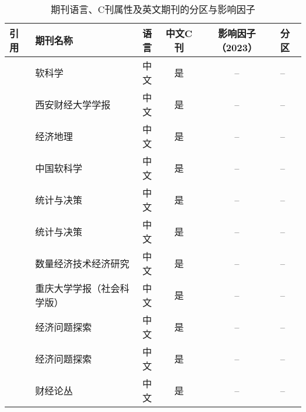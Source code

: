 \documentclass[nonblindrev]{write_paper}
\begin{document}
\newpage
 

\begin{table}[htbp]
\footnotesize
\centering
\caption{期刊语言、C刊属性及英文期刊的分区与影响因子}
\begin{tabular}{p{1cm}p{7cm}cccl}
\hline
\textbf{引用} & \textbf{期刊名称} & \textbf{语言} & \textbf{中文C刊} & \textbf{影响因子（2023）} & \textbf{分区} \\
\hline
\cite{彭桥2024中国新质生产力发展水平测度、动态演化与驱动因素研究} & 软科学 & 中文 & 是 & -- & -- \\
\cite{王珏2024新质生产力：指标构建与时空演进} & 西安财经大学学报 & 中文 & 是 & -- & -- \\
\cite{李光勤2024中国省域新质生产力水平评价、空间格局及其演化特征} & 经济地理 & 中文 & 是 & -- & -- \\

\cite{董庆前2024中国新质生产力发展水平测度、时空演变及收敛性研究} & 中国软科学 & 中文 & 是 & -- & -- \\
\cite{张海2024新质生产力发展水平、空间差异及动态演进} & 统计与决策 & 中文 & 是 & -- & -- \\
\cite{胡佳霖2024中国新质生产力：区域差距、动态演进与跃迁趋势} & 统计与决策 & 中文 & 是 & -- & -- \\
\cite{韩文龙2024新质生产力水平测算与中国经济增长新动能} & 数量经济技术经济研究 & 中文 & 是 & -- & -- \\
\cite{卢江2024新质生产力发展水平、区域差异与提升路径} & 重庆大学学报（社会科学版） & 中文 & 是 & -- & -- \\
\cite{简新华2024中国新质生产力水平测度及省际现状的比较分析} & 经济问题探索 & 中文 & 是 & -- & -- \\
\cite{杨智晨2025我国新质生产力发展的理论基础、时空特征及分异机理} & 经济问题探索 & 中文 & 是 & -- & -- \\
\cite{马大晋2025中国新质生产力发展水平区域评价与空间关联网络特征} & 财经论丛 & 中文 & 是 & -- & -- \\


\end{tabular}
\end{table}
\end{document}
